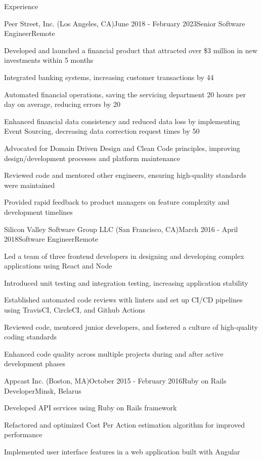 \documentclass{resume}
\begin{document}
  \begin{rSection}{Experience}
    \begin{rSubsection}{Peer Street, Inc. (Los Angeles, CA)}{June 2018 - February 2023}{Senior Software Engineer}{Remote}
    \item Developed and launched a financial product that attracted over \$3 million in new investments within 5 months
    \item Integrated banking systems, increasing customer transactions by 44%
    \item Automated financial operations, saving the servicing department 20 hours per day on average, reducing errors by 20%
    \item Enhanced financial data consistency and reduced data loss by implementing Event Sourcing, decreasing data correction request times by 50%
    \item Advocated for Domain Driven Design and Clean Code principles, improving design/development processes and platform maintenance
    \item Reviewed code and mentored other engineers, ensuring high-quality standards were maintained
    \item Provided rapid feedback to product managers on feature complexity and development timelines
    \end{rSubsection}

    \begin{rSubsection}{Silicon Valley Software Group LLC (San Francisco, CA)}{March 2016 - April 2018}{Software Engineer}{Remote}
    \item Led a team of three frontend developers in designing and developing complex applications using React and Node
    \item Introduced unit testing and integration testing, increasing application stability
    \item Established automated code reviews with linters and set up CI/CD pipelines using TravisCI, CircleCI, and Github Actions
    \item Reviewed code, mentored junior developers, and fostered a culture of high-quality coding standards
    \item Enhanced code quality across multiple projects during and after active development phases
    \end{rSubsection}

    \begin{rSubsection}{Appcast Inc. (Boston, MA)}{October 2015 - February 2016}{Ruby on Rails Developer}{Minsk, Belarus}
    \item Developed API services using Ruby on Rails framework
    \item Refactored and optimized Cost Per Action estimation algorithm for improved performance
    \item Implemented user interface features in a web application built with Angular
    \end{rSubsection}


\end{rSection}
\end{document}
